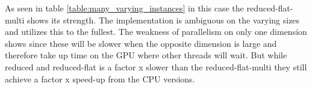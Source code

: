 
As seen in table \ref{table:many_varying_instances} in this case the reduced-flat-multi shows its strength. The implementation is ambiguous on the varying sizes and utilizes this to the fullest. The weakness of parallelism on only one dimension shows since these will be slower when the opposite dimension is large and therefore take up time on the GPU where other threads will wait. But while reduced and reduced-flat is a factor x slower than the reduced-flat-multi they still achieve a factor x speed-up from the CPU versions.
